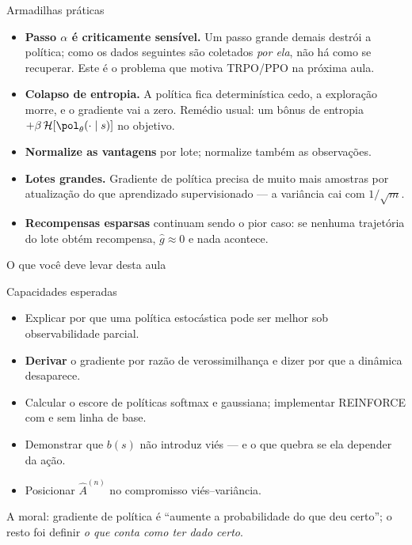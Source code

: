 \documentclass[aspectratio=169, 11pt]{beamer}
\newcommand{\thv}{\theta}                       %
\newcommand{\polth}{\pol_{\thv}}                %
\newcommand{\Ahat}{\hat{A}}
\begin{document}
\begin{frame}{Armadilhas práticas}

  \begin{itemize}\setlength{\itemsep}{0.45ex}
    \item \textbf{Passo $\alpha$ é criticamente sensível.} Um passo grande
      demais destrói a política; como os dados seguintes são coletados
      \emph{por ela}, não há como se recuperar. Este é o problema que motiva
      TRPO/PPO na próxima aula.
    \item \textbf{Colapso de entropia.} A política fica determinística cedo,
      a exploração morre, e o gradiente vai a zero. Remédio usual: um bônus de
      entropia $+\beta\,\mathcal{H}[\polth(\cdot\mid s)]$ no objetivo.
    \item \textbf{Normalize as vantagens} por lote; normalize também as
      observações.
    \item \textbf{Lotes grandes.} Gradiente de política precisa de muito mais
      amostras por atualização do que aprendizado supervisionado --- a
      variância cai com $1/\sqrt{m}$.
    \item \textbf{Recompensas esparsas} continuam sendo o pior caso: se
      nenhuma trajetória do lote obtém recompensa, $\hat g \approx 0$ e nada
      acontece.
  \end{itemize}
\end{frame}

\begin{frame}{O que você deve levar desta aula}

  \begin{defbox}{Capacidades esperadas}
    \begin{itemize}\setlength{\itemsep}{0.25ex}
      \item Explicar por que uma política estocástica pode ser melhor sob
        observabilidade parcial.
      \item \textbf{Derivar} o gradiente por razão de verossimilhança e dizer
        por que a dinâmica desaparece.
      \item Calcular o escore de políticas softmax e gaussiana; implementar
        REINFORCE com e sem linha de base.
      \item Demonstrar que $b(s)$ não introduz viés --- e o que quebra se ela
        depender da ação.
      \item Posicionar $\Ahat^{(n)}$ no compromisso viés--variância.
    \end{itemize}
  \end{defbox}

  \vspace{-0.9em}
  \begin{ideiabox}
    A moral: gradiente de política é ``aumente a probabilidade do que deu
    certo''; o resto foi definir \emph{o que conta como ter dado certo}.
  \end{ideiabox}
\end{frame}
\end{document}
